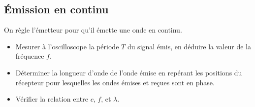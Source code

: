 \documentclass[]{tp}
\begin{document}
\subsection{Émission en continu}
On règle l'émetteur pour qu'il émette une onde en continu.
\begin{itemize}
  \item Mesurer à l'oscilloscope la période $T$ du signal émis, en déduire la valeur de la fréquence $f$. 

  \item Déterminer la longueur d'onde de l'onde émise en repérant les positions du récepteur pour lesquelles les ondes émises et reçues sont en phase.

  \item Vérifier la relation entre $c$, $f$, et $\lambda$. 
\end{itemize}
\end{document}

